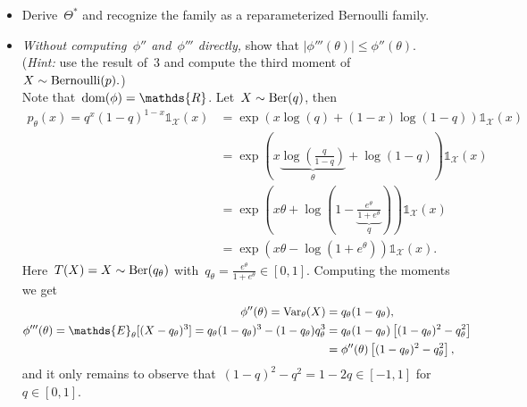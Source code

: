 \documentclass[11pt]{article}
\newcommand{\odima}[1]{{\color{red} #1}}
\newcommand{\R}{\mathds{R}}
\newcommand{\E}{\mathds{E}}
\newcommand{\Var}{\textup{Var}}
\newcommand{\cX}{\mathcal{X}}
\newcommand{\leqs}{\leqslant}
\renewcommand{\le}{\leqs}
\begin{document}
\begin{enumerate}
\begin{itemize}
\item Derive~$\Theta^*$ and recognize the family as a reparameterized Bernoulli family. 
\item {\em Without computing~$\phi''$ and~$\phi'''$ directly,} show that
$
|\phi'''(\theta)| \le \phi''(\theta).
$\\
({\em Hint:} use the result of~$3$ and compute the third moment of~$X \sim \textup{Bernoulli}(p).$)\\
\odima{
Note that~$\textup{dom}(\phi) = \R$.
Let~$X \sim \textup{Ber}(q)$, then
\[
\begin{aligned}
p_{\theta}(x) 
= q^x (1-q)^{1-x} \mathds{1}_{\cX}(x) 
&= \exp \left( x \log(q) + (1-x) \log(1-q) \right) \mathds{1}_{\cX}(x) \\
&= \exp \left( x \underbrace{\log \left( \frac{q}{1-q} \right)}_{\theta} + \log\left({1-q}\right) \right) \mathds{1}_{\cX}(x) \\
&= \exp \left( x \theta + \log\left(1-\underbrace{\frac{e^{\theta}}{1+e^{\theta}}}_{q}\right) \right) \mathds{1}_{\cX}(x) \\
&= \exp \left( x \theta - \log (1 + e^\theta) \right) \mathds{1}_{\cX}(x).
\end{aligned}
\]
Here~$T(X) = X \sim \textup{Ber}(q_\theta)$ with~$q_{\theta} = \frac{e^{\theta}}{1 + e^\theta} \in [0,1]$.
Computing the moments we get
\[
\begin{aligned}
\phi''(\theta) = \Var_{\theta}(X) 
&= q_\theta(1 - q_\theta), \\
\phi'''(\theta) = \E_{\theta}[(X - q_\theta)^3] 
 = q_\theta (1 - q_\theta)^3 - (1-q_\theta) q_\theta^3 
 &= q_\theta (1 - q_\theta) \left[ (1 - q_\theta)^2 - q_\theta^2 \right] \\
 &= \phi''(\theta) \left[ (1 - q_\theta)^2 - q_\theta^2 \right],
\end{aligned}
\]
and it only remains to observe that~$(1 - q)^2 - q^2 = 1 - 2q \in [-1,1]$ for~$q \in [0,1]$.
}


\end{itemize}

\end{enumerate}



\newpage
\end{document}
